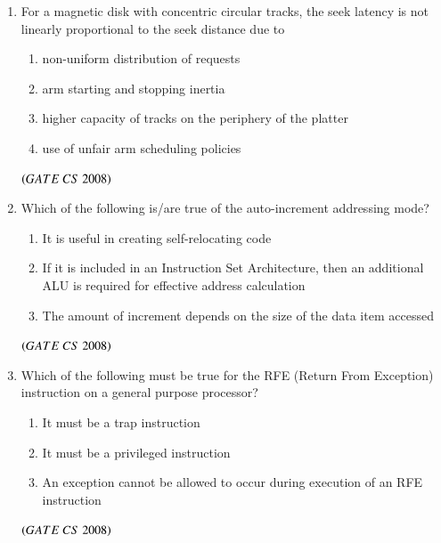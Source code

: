 \documentclass[journal]{IEEEtran}
\numberwithin{equation}{enumi}
\numberwithin{figure}{enumi}
\begin{document}
\begin{enumerate}
\item For a magnetic disk with concentric circular tracks, the seek latency is not linearly
proportional to the seek distance due to 
\begin{enumerate}
   \item non-uniform distribution of requests
   \item  arm starting and stopping inertia
   \item higher capacity of tracks on the periphery of the platter
   \item use of unfair arm scheduling policies
\end{enumerate}
\hfill $\left(GATE\ CS\  2008\right)$
 

\item Which of the following is/are true of the auto-increment addressing mode? 
\begin{enumerate}   
   \item It is useful in creating self-relocating code
   \item  If it is included in an Instruction Set Architecture, then an additional ALU is required for effective address calculation
   \item The amount of increment depends on the size of the data item accessed 
\end{enumerate}

 \begin{enumerate}
 \end{enumerate}
\hfill $\left(GATE\ CS\  2008\right)$

\item Which of the following must be true for the RFE (Return From Exception) instruction on a general purpose processor?
\begin{enumerate}   
   \item It must be a trap instruction
   \item It must be a privileged instruction
   \item An exception cannot be allowed to occur during execution of an RFE instruction
\end{enumerate}
\begin{enumerate}
\end{enumerate}
\hfill $\left(GATE\ CS\  2008\right)$


\end{enumerate}
\end{document}
